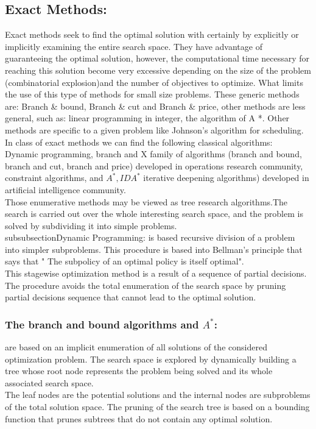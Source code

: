 \subsection{Exact Methods:}
Exact methods seek to find the optimal solution with certainly by explicitly or implicitly examining the entire search space. They have advantage of guaranteeing the optimal solution, however, the computational time necessary for reaching this solution become very excessive depending on the size of the problem (combinatorial explosion)and the number of objectives to optimize. What limits the use of this type of methods for small size problems. These generic methods are: Branch \& bound, Branch \& cut and Branch \& price, other methods are less general, such as: linear programming in integer, the algorithm of A *. Other methods are specific to a given problem like Johnson's algorithm for scheduling.\\
In class of exact methods we can find the following classical algorithms:\\
Dynamic programming, branch and X family of algorithms (branch and bound, branch and cut, branch and price) developed in operations research community, constraint algorithms, and $A^{*}, IDA^{*}$ iterative deepening algorithms) developed in artificial intelligence community.\\
Those enumerative methods may be viewed as tree research algorithms.The search is carried out over the whole interesting search space, and the problem is solved by subdividing it into simple problems.
\\subsubsection{Dynamic Programming:}
is based recursive division of a problem into simpler subproblems. This procedure is based into  Bellman's principle that says that " The subpolicy of an optimal policy is itself optimal".\\
This stagewise optimization method is a result of a sequence of partial decisions. The procedure avoids the total enumeration of the search space by pruning partial decisions sequence that cannot lead to the optimal solution.
\subsubsection{The branch and bound algorithms and $A^{*}$:}
are based on an implicit enumeration of all solutions of the considered optimization problem. The search space is explored by dynamically building a tree whose root node represents the problem being solved and its whole associated search space.\\
The leaf nodes are the potential solutions and the internal nodes are subproblems of the total solution space. The pruning of the search tree is based on a bounding function that prunes subtrees that do not contain any optimal solution.
